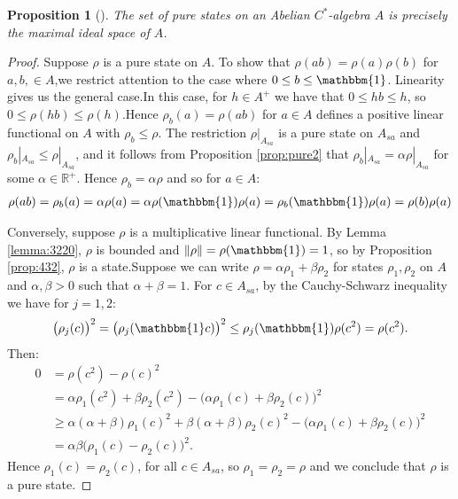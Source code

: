 \documentclass[11pt,a4paper]{report}
\theoremstyle{plain}
\newtheorem{prop}{Proposition}
\theoremstyle{definition}
\newcommand{\1}{\mathbbm{1}}
\newcommand{\R}{\mathbb{R}}
\begin{document}
\begin{prop}[{\cite[4.4.1]{kadison83}}]\label{prop:puremult}
	The set of pure states on an Abelian $C^\ast$-algebra $A$ is precisely the 
	maximal ideal space of $A$.
\end{prop}
\begin{proof}
	Suppose $\rho$ is a pure state on $A$. To show that $\rho(ab)=\rho(a)\rho(b)$ 
	for $a,b,\in A$,we restrict attention to the case where $0\leq b\leq\1$. 
	Linearity gives us the general case.In this case, for $h\in A^+$ we have that 
	$0\leq hb\leq h$, so $0\leq\rho(hb)\leq\rho(h)$.Hence $\rho_b(a)=\rho(ab)$ for 
	$a\in A$ defines a positive linear functional on $A$ with $\rho_b\leq\rho$. The 
	restriction $\rho|_{A_{sa}}$ is a pure state on $A_{sa}$ and $\rho_b|_{A_{sa}} 
	\leq \rho|_{A_{sa}}$, and it follows from Proposition \ref{prop:pure2} that 
	$\rho_b|_{A_{sa}} = \alpha \rho|_{A_{sa}}$ for some $\alpha \in \R^+$.
	Hence $\rho_b = \alpha\rho$  and so for $a\in A$:
	\begin{align*}
		\rho(ab) = \rho_b(a) = \alpha\rho(a) = 
							\alpha\rho(\1)\rho(a) = \rho_b(\1)\rho(a) = \rho(b)\rho(a)
	\end{align*}
	
	Conversely, suppose $\rho$ is a multiplicative linear functional. By Lemma 
	\ref{lemma:3220}, $\rho$ is bounded and $\left\|\rho\right\|=\rho(\1)=1$, so by 
	Proposition \ref{prop:432}, $\rho$ is a state.Suppose we can write 
	$\rho=\alpha\rho_1+\beta\rho_2$ for states $\rho_1,\rho_2$ on $A$ and 
	$\alpha,\beta >0$ such that $\alpha+\beta=1$. For $c\in A_{sa}$, by the 
	Cauchy-Schwarz inequality we have for $j=1,2$:
	\begin{align*}
		\big(\rho_j(c)\big)^2 = \big(\rho_j(\1 c)\big)^2 
					\leq \rho_j(\1)\rho(c^2)=\rho(c^2).
	\end{align*}
	Then:
	\begin{align*}
				0
		&=		\rho(c^2)-\rho(c)^2 														\\
		&=		\alpha\rho_1(c^2)+\beta\rho_2(c^2) 
						- \big(\alpha\rho_1(c)+\beta\rho_2(c)\big)^2						\\
		&\geq	\alpha(\alpha+\beta)\rho_1(c)^2 
						+ \beta(\alpha+\beta)\rho_2(c)^2
						- \big(\alpha\rho_1(c)+\beta\rho_2(c)\big)^2						\\
		&=		\alpha\beta\big(\rho_1(c) - \rho_2(c)\big)^2.
	\end{align*}
	Hence $\rho_1(c)=\rho_2(c)$, for all $c\in A_{sa}$, so $\rho_1=\rho_2 =\rho$ and 
	we conclude that $\rho$ is a pure state.
\end{proof}
\end{document}
